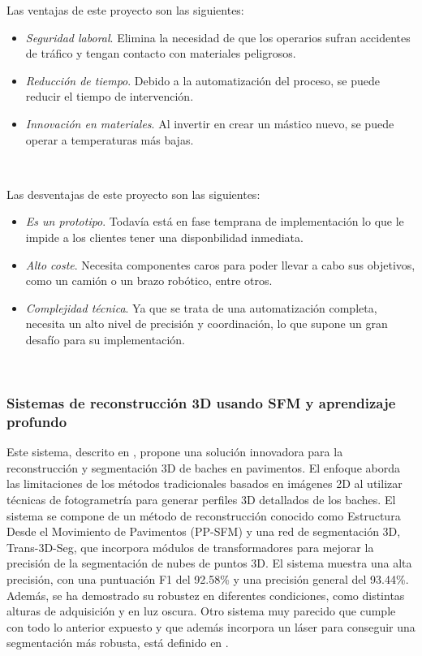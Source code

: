 Las ventajas de este proyecto son las siguientes:

\begin{itemize}
	\item \textit{Seguridad laboral}. Elimina la necesidad de que los operarios sufran accidentes de tráfico y tengan contacto con materiales peligrosos.
	\item \textit{Reducción de tiempo}. Debido a la automatización del proceso, se puede reducir el tiempo de intervención.
	\item \textit{Innovación en materiales}. Al invertir en crear un mástico nuevo, se puede operar a temperaturas más bajas.
\end{itemize}\


Las desventajas de este proyecto son las siguientes:

\begin{itemize}
	\item \textit{Es un prototipo}. Todavía está en fase temprana de implementación lo que le impide a los clientes tener una disponbilidad inmediata.
	\item \textit{Alto coste}. Necesita componentes caros para poder llevar a cabo sus objetivos, como un camión o un brazo robótico, entre otros.
	\item \textit{Complejidad técnica}. Ya que se trata de una automatización completa, necesita un alto nivel de precisión y coordinación, lo que supone un gran desafío para su implementación.
\end{itemize}\

\subsubsection{Sistemas de reconstrucción 3D usando SFM y aprendizaje profundo}


Este sistema, descrito en \cite{WANG2023132499}, propone una solución innovadora para la reconstrucción y segmentación 3D de baches en pavimentos. El enfoque aborda las limitaciones de los métodos tradicionales basados en imágenes 2D al utilizar técnicas de fotogrametría para generar perfiles 3D detallados de los baches. El sistema se compone de un método de reconstrucción conocido como Estructura Desde el Movimiento de Pavimentos (PP-SFM) y una red de segmentación 3D, Trans-3D-Seg, que incorpora módulos de transformadores para mejorar la precisión de la segmentación de nubes de puntos 3D. El sistema muestra una alta precisión, con una puntuación F1 del 92.58\% y una precisión general del 93.44\%. Además, se ha demostrado su robustez en diferentes condiciones, como distintas alturas de adquisición y en luz oscura. Otro sistema muy parecido que cumple con todo lo anterior expuesto y que además incorpora un láser para conseguir una segmentación más robusta, está definido en \cite{9345528}.

